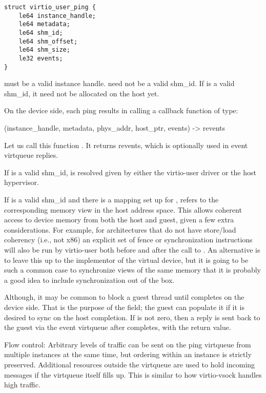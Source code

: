 \begin{lstlisting}
struct virtio_user_ping {
    le64 instance_handle;
    le64 metadata;
    le64 shm_id;
    le64 shm_offset;
    le64 shm_size;
    le32 events;
}
\end{lstlisting}

 must be a valid instance handle.
 need not be a valid shm_id.
If  is a valid shm_id,
it need not be allocated on the host yet.

On the device side, each ping results in calling a callback function of type:

(instance_handle, metadata, phys_addr, host_ptr, events) -> revents

Let us call this function .
It returns revents, which is optionally used in event virtqueue replies.

If  is a valid shm_id,
 is resolved given  by either
the virtio-user driver or the host hypervisor.

If  is a valid shm_id
and there is a mapping set up for ,
 refers to the corresponding memory view in the host address space.
This allows coherent access to device memory from both the host and guest, given
a few extra considerations.
For example, for architectures that do not have store/load coherency (i.e., not x86)
an explicit set of fence or synchronization instructions will also be run by virtio-user
both before and after the call to .
An alternative is to leave this up to the implementor of the virtual device,
but it is going to be such a common case to synchronize views of the same memory
that it is probably a good idea to include synchronization out of the box.

Although, it may be common to block a guest thread until 
completes on the device side.
That is the purpose of the  field; the guest can populate it
if it is desired to sync on the host completion.
If  is not zero, then a reply is sent
back to the guest via the event virtqueue  after  completes,
with the  return value.

Flow control: Arbitrary levels of traffic can be sent
on the ping virtqueue from multiple instances at the same time,
but ordering within an instance is strictly preserved.
Additional resources outside the virtqueue are used to hold incoming messages
if the virtqueue itself fills up.
This is similar to how virtio-vsock handles high traffic.

